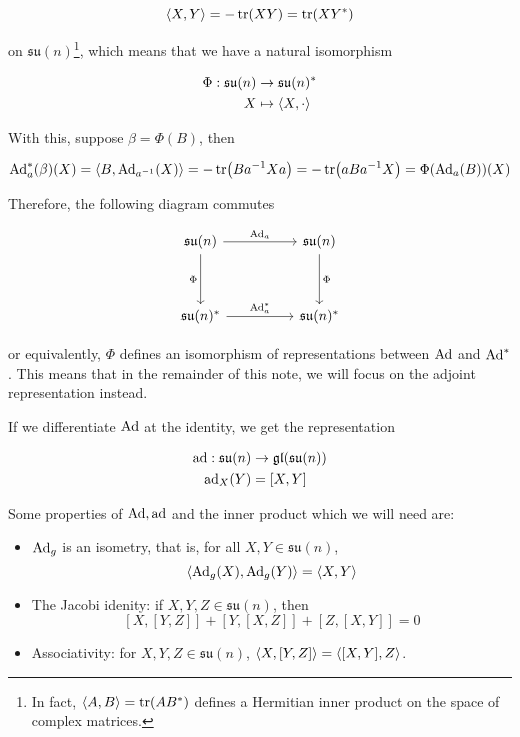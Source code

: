 \documentclass{report}
\newcommand{\su}{\mathfrak{su}}
\begin{document}
\[\left\langle X, Y \right\rangle = -\tr(XY) = \tr(XY^*)\]

on \(\su(n)\)\footnote{In fact, \(\left\langle A, B \right\rangle = \tr(AB^*)\) defines a Hermitian inner product on the space of complex matrices.}, which means that we have a natural isomorphism

\begin{align*}
    \Phi : \su(n) &\to \su(n)^* \\
    X &\mapsto \inner{X, \cdot}
\end{align*}

With this, suppose \(\beta = \Phi(B)\), then

\[\operatorname{Ad}_a^*(\beta)(X) = \left\langle B, \operatorname{Ad}_{a^{-1}}(X) \right\rangle = -\tr(Ba^{-1}Xa) = -\tr(aBa^{-1}X) = \Phi(\operatorname{Ad}_a(B))(X)\]

Therefore, the following diagram commutes

\[\begin{tikzcd}
	{\su(n)} && {\su(n)} \\
	\\
	{\su(n)^*} && {\su(n)^*}
	\arrow["{\Ad_a^*}", from=3-1, to=3-3]
	\arrow["{\Ad_a}", from=1-1, to=1-3]
	\arrow["\Phi"', from=1-1, to=3-1]
	\arrow["\Phi", from=1-3, to=3-3]
\end{tikzcd}\]

or equivalently, \(\Phi\) defines an isomorphism of representations between \(\operatorname{Ad}\) and \(\operatorname{Ad}^*\). This means that in the remainder of this note, we will focus on the adjoint representation instead.

If we differentiate \(\operatorname{Ad}\) at the identity, we get the representation

\begin{align*}
    \ad : \su(n) &\to \gl(\su(n))\\
    \ad_X(Y) &= [X, Y]
\end{align*}

Some properties of \(\operatorname{Ad}, \operatorname{ad}\) and the inner product which we will need are:

\begin{itemize}
    \item \(\operatorname{Ad}_g\) is an isometry, that is, for all \(X, Y \in \su(n)\), \[\left\langle \operatorname{Ad}_g(X), \operatorname{Ad}_g(Y) \right\rangle = \left\langle X, Y \right\rangle\]
    \item The Jacobi idenity: if \(X, Y, Z \in \su(n)\), then \[[X, [Y, Z]] + [Y, [X, Z]] + [Z, [X, Y]] = 0\]
    \item Associativity: for \(X, Y, Z \in \su(n)\), \(\left\langle X, [Y, Z] \right\rangle = \left\langle [X, Y], Z \right\rangle\).
\end{itemize}
\end{document}

